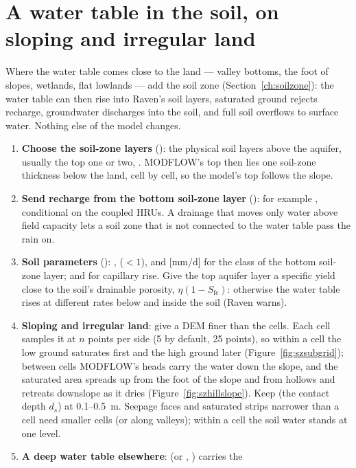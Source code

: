 \section{A water table in the soil, on sloping and irregular land}\label{sec:applysz}
Where the water table comes close to the land --- valley bottoms, the foot of slopes, wetlands, flat lowlands --- add the
soil zone (Section~\ref{ch:soilzone}): the water table can then rise into Raven's soil layers, saturated ground rejects
recharge, groundwater discharges into the soil, and full soil overflows to surface water. Nothing else of the model changes.
\begin{enumerate}
\item \textbf{Choose the soil-zone layers} (): the physical soil layers above the aquifer, usually the top one
or two, . MODFLOW's top then lies one soil-zone thickness below the land, cell by
cell, so the model's top follows the slope.
\item \textbf{Send recharge from the bottom soil-zone layer} (): for example
, conditional on the coupled HRUs. A drainage that moves only water above
field capacity lets a soil zone that is not connected to the water table pass the rain on.
\item \textbf{Soil parameters} (): ,  ($<1$), and  [mm/d] for
the class of the bottom soil-zone layer;  and  for capillary rise. Give the top
aquifer layer a specific yield close to the soil's drainable porosity, $\eta(1-S_{\mathrm{fc}})$: otherwise the water table
rises at different rates below and inside the soil (Raven warns).
\item \textbf{Sloping and irregular land}: give a DEM finer than the cells. Each cell samples it at
 $n$ points per side (5 by default, 25 points), so within a cell the low ground saturates first
and the high ground later (Figure~\ref{fig:szsubgrid}); between cells MODFLOW's heads carry the water down the slope, and
the saturated area spreads up from the foot of the slope and from hollows and retreats downslope as it dries
(Figure~\ref{fig:szhillslope}). Keep  (the contact depth $d_s$) at 0.1--0.5~m. Seepage
faces and saturated strips narrower than a cell need smaller cells (or  along valleys); within a cell
the soil water stands at one level.
\item \textbf{A deep water table elsewhere}:  (or , ) carries the

\end{enumerate}
